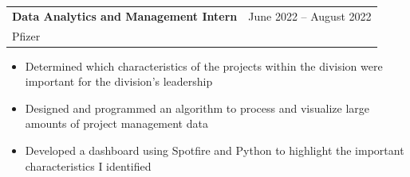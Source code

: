 \documentclass[a4paper,10pt]{article}
\makeatletter
\newcommand{\resumeItem}[1]{
  \item\small{
    {#1\vspace{-2pt}}
  }
}
\newcommand{\resumeSubheading}[4]{
  \vspace{-2pt}\item
    \begin{tabular*}{0.97\textwidth}[t]{l@{\extracolsep{\fill}}r}
      \textbf{#1} & #2 \\
      \small#3 & \small #4 \\
    \end{tabular*}\vspace{-7pt}
}
\newcommand{\resumeSubSubheading}[2]{
    \item
    \begin{tabular*}{0.97\textwidth}{l@{\extracolsep{\fill}}r}
      \textit{\small#1} & \textit{\small #2} \\
    \end{tabular*}\vspace{-7pt}
}
\newcommand{\resumeSubHeadingListEnd}{\end{itemize}}
\newcommand{\resumeItemListStart}{\begin{itemize}}
\newcommand{\resumeItemListEnd}{\end{itemize}\vspace{-5pt}}
\makeatother
\begin{document}

  
    \resumeSubheading
      {Data Analytics and Management Intern}{June 2022 -- August 2022}
      {Pfizer}{}
      \resumeItemListStart
        \resumeItem{Determined which characteristics of the projects within the division were important for the division's leadership}
        \resumeItem{Designed and programmed an algorithm to process and visualize large amounts of project management data}
        \resumeItem{Developed a dashboard using Spotfire and Python to highlight the important characteristics I identified}
      \resumeItemListEnd
      


\end{document}
